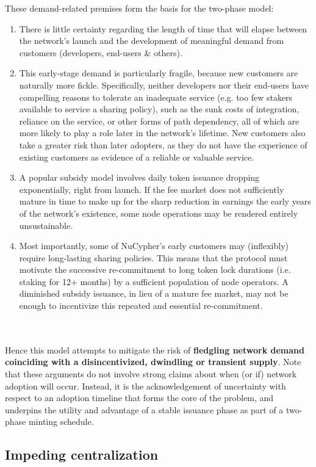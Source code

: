 \documentclass[8pt]{article}
\begin{document}
These demand-related premises form the basis for the two-phase model: 
\begin{enumerate}
\item There is little certainty regarding the length of time that will elapse between the network's launch and the development of meaningful demand from customers (developers, end-users \& others).
\item This early-stage demand is particularly fragile, because new customers are naturally more fickle. Specifically, neither developers nor their end-users have compelling reasons to tolerate an inadequate service (e.g. too few stakers available to service a sharing policy), such as the sunk costs of integration, reliance on the service, or other forms of path dependency, all of which are more likely to play a role later in the network's lifetime. New customers also take a greater risk than later adopters, as they do not have the experience of existing customers as evidence of a reliable or valuable service.
\item A popular subsidy model involves daily token issuance dropping exponentially, right from launch. If the fee market does not sufficiently mature in time to make up for the sharp reduction in earnings the early years of the network's existence, some node operations may be rendered entirely unsustainable. 
\item Most importantly, some of NuCypher's early customers may (inflexibly) require long-lasting sharing policies. This means that the protocol must motivate the successive re-commitment to long token lock durations (i.e. staking for 12+ months) by a sufficient population of node operators. A diminished subsidy issuance, in lieu of a mature fee market, may not be enough to incentivize this repeated and essential re-commitment. 
\end{enumerate}

\\\\
Hence this model attempts to mitigate the risk of \textbf{fledgling network demand coinciding with a disincentivized, dwindling or transient supply}. Note that these arguments do not involve strong claims about when (or if) network adoption will occur. Instead, it is the acknowledgement of uncertainty with respect to an adoption timeline that forms the core of the problem, and underpins the utility and advantage of a stable issuance phase as part of a two-phase minting schedule. 

\subsection{Impeding centralization}
\end{document}
